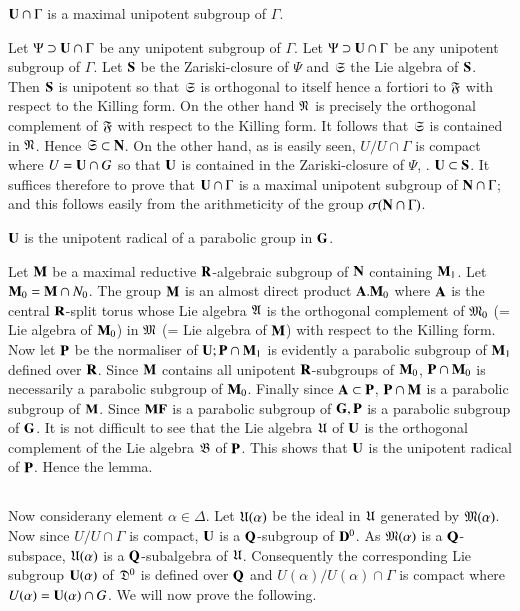 \begin{lemma}\label{art9-lem4.7}
$\mathbf{U} \cap \Gamma$ is a maximal unipotent subgroup of $\Gamma$.
\end{lemma}

Let $\Psi \supset \mathbf{U} \cap \Gamma$ be any unipotent subgroup of $\Gamma$. Let $\Psi \supset \mathbf{U} \cap \Gamma$ be any unipotent subgroup of $\Gamma$. Let $\mathbf{S}$ be the Zariski-closure of $\Psi$ and $\mathfrak{S}$ the Lie algebra of $\mathbf{S}$. Then $\mathbf{S}$ is unipotent so that $\mathfrak{S}$ is orthogonal to itself hence a fortiori to $\mathfrak{F}$ with respect to the Killing form. On the other hand $\mathfrak{N}$ is precisely the orthogonal complement of $\mathfrak{F}$ with respect to the Killing form. It follows that $\mathfrak{S}$ is contained in $\mathfrak{N}$. Hence $\mathfrak{S} \subset \mathbf{N}$. On the other hand, as is easily seen, $U/U \cap \Gamma$ is compact where $U = \mathbf{U} \cap G$ so that $\mathbf{U}$ is contained in the Zariski-closure of $\Psi$, \ie. $\mathbf{U} \subset \mathbf{S}$. It suffices therefore to prove that $\mathbf{U} \cap \Gamma$ is a maximal unipotent subgroup of $\mathbf{N} \cap \Gamma$; and this follows easily from the arithmeticity of the group $\sigma (\mathbf{N} \cap \Gamma)$.

\begin{lemma}\label{art9-lem4.8}
$\mathbf{U}$ is the unipotent radical of a parabolic group in $\mathbf{G}$.
\end{lemma}

Let $\mathbf{M}$ be a maximal reductive $\mathbf{R}$-algebraic subgroup of $\mathbf{N}$ containing $\mathbf{M}_1$. Let $\mathbf{M}_0 = \mathbf{M} \cap N_0$. The group $\mathbf{M}$ is an almost direct product $\mathbf{A}. \mathbf{M}_0$ where $\mathbf{A}$ is the central $\mathbf{R}$-split torus whose Lie algebra $\mathfrak{A}$ is the orthogonal complement of $\mathfrak{M}_0$ (= Lie algebra of $\mathbf{M}_0$) in $\mathfrak{M}$ (= Lie algebra of $\mathbf{M}$) with respect to the Killing form. Now let $\mathbf{P}$ be the normaliser of $\mathbf{U}; \mathbf{P} \cap \mathbf{M}_1$ is evidently a parabolic subgroup of $\mathbf{M}_1$ defined over $\mathbf{R}$. Since $\mathbf{M}$ contains all unipotent $\mathbf{R}$-subgroups of $\mathbf{M}_0$, $\mathbf{P} \cap \mathbf{M}_0$ is  necessarily a parabolic subgroup of $\mathbf{M}_0$. Finally since $\mathbf{A} \subset \mathbf{P}$, $\mathbf{P} \cap \mathbf{M}$ is a parabolic subgroup of $\mathbf{M}$. Since $\mathbf{M} \mathbf{F}$ is a parabolic subgroup of $\mathbf{G}, \mathbf{P}$ is a parabolic subgroup of $\mathbf{G}$. It is not difficult to see that the Lie algebra $\mathfrak{U}$ of $\mathbf{U}$ is the orthogonal complement of the Lie algebra $\mathfrak{B}$ of $\mathbf{P}$. This shows that $\mathbf{U}$ is the unipotent radical of $\mathbf{P}$. Hence the lemma.

\subsection{}\label{art9-subsec4.9}
Now consider\pageoriginale any element $\alpha \in \Delta$. Let $\mathfrak{U} (\alpha)$ be the ideal in $\mathfrak{U}$ generated by $\mathfrak{M} (\alpha)$. Now since $U / U \cap \Gamma$ is compact, $\mathbf{U}$ is a $\mathbf{Q}$-subgroup of $\mathbf{D}^0$. As $\mathfrak{M}(\alpha)$ is a $\mathbf{Q}$-subspace, $\mathfrak{U} (\alpha)$ is a $\mathbf{Q}$-subalgebra of $\mathfrak{U}$. Consequently the corresponding Lie subgroup $\mathbf{U} (\alpha)$ of $\mathfrak{D}^0$ is defined  over $\mathbf{Q}$ and $U (\alpha) / U (\alpha) \cap \Gamma$ is compact where $U (\alpha) = \mathbf{U} (\alpha) \cap G$. We will now prove the following.

